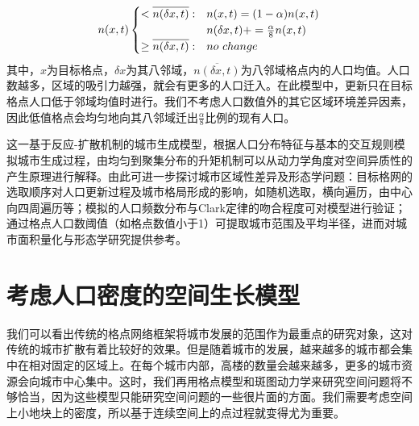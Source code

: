 \begin{equation}
n(x,t) 
\begin{cases}
	<\overline{n(\delta x,t)}: & n(x,t)=(1-\alpha)n(x,t) \notag\\
	 & n(\delta x,t) += \frac{\alpha}{8}n(x,t)\notag\\
	\geq\overline{n(\delta x,t)}: & no\ change
\end{cases}
\end{equation}
其中，$x$为目标格点，$\delta x$为其八邻域，$\overline{n(\delta x,t)}$为八邻域格点内的人口均值。人口数越多，区域的吸引力越强，就会有更多的人口迁入。在此模型中，更新只在目标格点人口低于邻域均值时进行。我们不考虑人口数值外的其它区域环境差异因素，因此低值格点会均匀地向其八邻域迁出$\frac{\alpha}{8}$比例的现有人口。

这一基于反应-扩散机制的城市生成模型，根据人口分布特征与基本的交互规则模拟城市生成过程，由均匀到聚集分布的升矩机制可以从动力学角度对空间异质性的产生原理进行解释。由此可进一步探讨城市区域性差异及形态学问题：目标格网的选取顺序对人口更新过程及城市格局形成的影响，如随机选取，横向遍历，由中心向四周遍历等；模拟的人口频数分布与Clark定律的吻合程度可对模型进行验证；通过格点人口数阈值（如格点数值小于1）可提取城市范围及平均半径，进而对城市面积量化与形态学研究提供参考。


\section{考虑人口密度的空间生长模型}

我们可以看出传统的格点网络框架将城市发展的范围作为最重点的研究对象，这对传统的城市扩散有着比较好的效果。但是随着城市的发展，越来越多的城市都会集中在相对固定的区域上。在每个城市内部，高楼的数量会越来越多，更多的城市资源会向城市中心集中\cite{BerryThe}。这时，我们再用格点模型和斑图动力学来研究空间问题将不够恰当，因为这些模型只能研究空间问题的一些很片面的方面。我们需要考虑空间上小地块上的密度，所以基于连续空间上的点过程就变得尤为重要。


